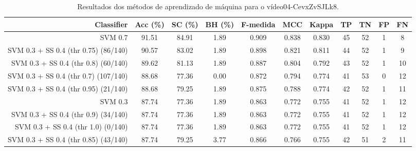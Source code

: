 \begin{table}[!htb]
\centering
\caption{Resultados dos métodos de aprendizado de máquina para o vídeo04-CevxZvSJLk8.}
\label{tab:04-CevxZvSJLk8}
\begin{tabular}{r|c|c|c|c|c|c|c|c|c|c}
\hline\hline
Classifier & Acc (\%) & SC (\%) & BH (\%) & F-medida & MCC & Kappa & TP & TN & FP & FN \\ \hline
SVM 0.7 & 91.51 & 84.91 & 1.89 & 0.909 & 0.838 & 0.830 & 45 & 52 & 1 & 8 \\ 
SVM 0.3 + SS 0.4 (thr 0.75) (86/140) & 90.57 & 83.02 & 1.89 & 0.898 & 0.821 & 0.811 & 44 & 52 & 1 & 9 \\ 
SVM 0.3 + SS 0.4 (thr 0.8) (60/140) & 89.62 & 81.13 & 1.89 & 0.887 & 0.804 & 0.792 & 43 & 52 & 1 & 10 \\ 
SVM 0.3 + SS 0.4 (thr 0.7) (107/140) & 88.68 & 77.36 & 0.00 & 0.872 & 0.794 & 0.774 & 41 & 53 & 0 & 12 \\ 
SVM 0.3 + SS 0.4 (thr 0.95) (21/140) & 88.68 & 79.25 & 1.89 & 0.875 & 0.788 & 0.774 & 42 & 52 & 1 & 11 \\ 
SVM 0.3 & 87.74 & 77.36 & 1.89 & 0.863 & 0.772 & 0.755 & 41 & 52 & 1 & 12 \\ 
SVM 0.3 + SS 0.4 (thr 0.9) (34/140) & 87.74 & 77.36 & 1.89 & 0.863 & 0.772 & 0.755 & 41 & 52 & 1 & 12 \\ 
SVM 0.3 + SS 0.4 (thr 1.0) (0/140) & 87.74 & 77.36 & 1.89 & 0.863 & 0.772 & 0.755 & 41 & 52 & 1 & 12 \\ 
SVM 0.3 + SS 0.4 (thr 0.85) (43/140) & 87.74 & 79.25 & 3.77 & 0.866 & 0.766 & 0.755 & 42 & 51 & 2 & 11 \\ 
\hline\hline
\end{tabular}
\end{table}
